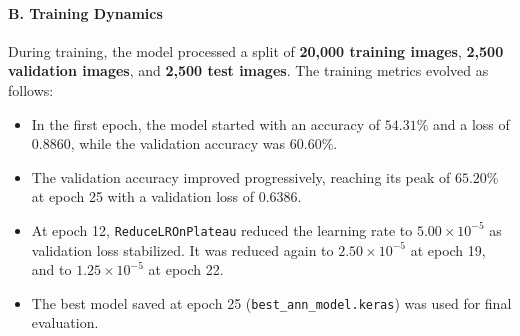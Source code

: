 \documentclass[12pt,a4paper]{article}
\begin{document}
\paragraph{B. Training Dynamics}
During training, the model processed a split of \textbf{20,000 training images}, \textbf{2,500 validation images}, and \textbf{2,500 test images}. The training metrics evolved as follows:
\begin{itemize}
    \item In the first epoch, the model started with an accuracy of $54.31\%$ and a loss of 0.8860, while the validation accuracy was $60.60\%$.
    \item The validation accuracy improved progressively, reaching its peak of \textbf{$65.20\%$} at epoch 25 with a validation loss of 0.6386.
    \item At epoch 12, \texttt{ReduceLROnPlateau} reduced the learning rate to $5.00 \times 10^{-5}$ as validation loss stabilized. It was reduced again to $2.50 \times 10^{-5}$ at epoch 19, and to $1.25 \times 10^{-5}$ at epoch 22.
    \item The best model saved at epoch 25 (\texttt{best\_ann\_model.keras}) was used for final evaluation.
\end{itemize}
\end{document}
